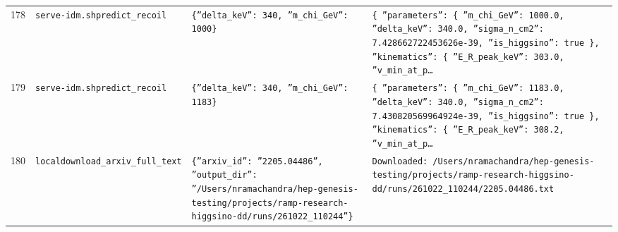 \documentclass[11pt,a4paper]{article}
\begin{document}
\begin{longtable}{@{}p{}p{}p{}p{}@{}}
178 & \texttt{serve-idm.sh}\newline\texttt{predict\_\allowbreak{}recoil} & \texttt{\{''delta\_\allowbreak{}keV'':\allowbreak{} 340,\allowbreak{} ''m\_\allowbreak{}chi\_\allowbreak{}GeV'':\allowbreak{} 1000\}\allowbreak{}} & \texttt{\{   ''parameters'':\allowbreak{} \{     ''m\_\allowbreak{}chi\_\allowbreak{}GeV'':\allowbreak{} 1000.0,\allowbreak{}     ''delta\_\allowbreak{}keV'':\allowbreak{} 340.0,\allowbreak{}     ''sigma\_\allowbreak{}n\_\allowbreak{}cm2'':\allowbreak{} 7.428662722453626e-39,\allowbreak{}     ''is\_\allowbreak{}higgsino'':\allowbreak{} true   \}\allowbreak{},\allowbreak{}   ''kinematics'':\allowbreak{} \{     ''E\_\allowbreak{}R\_\allowbreak{}peak\_\allowbreak{}keV'':\allowbreak{} 303.0,\allowbreak{}     ''v\_\allowbreak{}min\_\allowbreak{}at\_\allowbreak{}p\ldots{}\allowbreak{}} \\
179 & \texttt{serve-idm.sh}\newline\texttt{predict\_\allowbreak{}recoil} & \texttt{\{''delta\_\allowbreak{}keV'':\allowbreak{} 340,\allowbreak{} ''m\_\allowbreak{}chi\_\allowbreak{}GeV'':\allowbreak{} 1183\}\allowbreak{}} & \texttt{\{   ''parameters'':\allowbreak{} \{     ''m\_\allowbreak{}chi\_\allowbreak{}GeV'':\allowbreak{} 1183.0,\allowbreak{}     ''delta\_\allowbreak{}keV'':\allowbreak{} 340.0,\allowbreak{}     ''sigma\_\allowbreak{}n\_\allowbreak{}cm2'':\allowbreak{} 7.430820569964924e-39,\allowbreak{}     ''is\_\allowbreak{}higgsino'':\allowbreak{} true   \}\allowbreak{},\allowbreak{}   ''kinematics'':\allowbreak{} \{     ''E\_\allowbreak{}R\_\allowbreak{}peak\_\allowbreak{}keV'':\allowbreak{} 308.2,\allowbreak{}     ''v\_\allowbreak{}min\_\allowbreak{}at\_\allowbreak{}p\ldots{}\allowbreak{}} \\
180 & \texttt{local}\newline\texttt{download\_\allowbreak{}arxiv\_\allowbreak{}full\_\allowbreak{}text} & \texttt{\{''arxiv\_\allowbreak{}id'':\allowbreak{} ''2205.04486'',\allowbreak{} ''output\_\allowbreak{}dir'':\allowbreak{} ''/\allowbreak{}Users/\allowbreak{}nramachandra/\allowbreak{}hep-genesis-testing/\allowbreak{}projects/\allowbreak{}ramp-research-higgsino-dd/\allowbreak{}runs/\allowbreak{}261022\_\allowbreak{}110244''\}\allowbreak{}} & \texttt{Downloaded:\allowbreak{} /\allowbreak{}Users/\allowbreak{}nramachandra/\allowbreak{}hep-genesis-testing/\allowbreak{}projects/\allowbreak{}ramp-research-higgsino-dd/\allowbreak{}runs/\allowbreak{}261022\_\allowbreak{}110244/\allowbreak{}2205.04486.txt} \\

\end{longtable}
\end{document}

